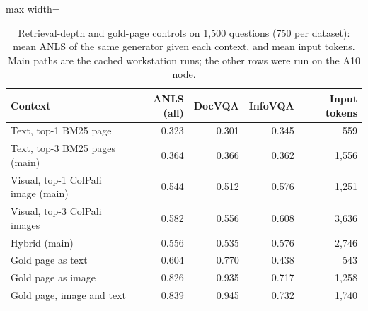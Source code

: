 \begin{table}[t]
\centering
\caption{Retrieval-depth and gold-page controls on 1,500 questions (750 per dataset): mean ANLS of the same generator given each context, and mean input tokens. Main paths are the cached workstation runs; the other rows were run on the A10 node.}
\label{tab:controls}
\begin{adjustbox}{max width=\linewidth}
\begin{tabular}{lrrrr}
\toprule
\textbf{Context} & \textbf{ANLS (all)} & \textbf{DocVQA} & \textbf{InfoVQA} & \textbf{Input tokens} \\
\midrule
Text, top-1 BM25 page & 0.323 & 0.301 & 0.345 & 559 \\
Text, top-3 BM25 pages (main) & 0.364 & 0.366 & 0.362 & 1,556 \\
Visual, top-1 ColPali image (main) & 0.544 & 0.512 & 0.576 & 1,251 \\
Visual, top-3 ColPali images & 0.582 & 0.556 & 0.608 & 3,636 \\
Hybrid (main) & 0.556 & 0.535 & 0.576 & 2,746 \\
Gold page as text & 0.604 & 0.770 & 0.438 & 543 \\
Gold page as image & 0.826 & 0.935 & 0.717 & 1,258 \\
Gold page, image and text & 0.839 & 0.945 & 0.732 & 1,740 \\
\bottomrule
\end{tabular}
\end{adjustbox}
\end{table}
